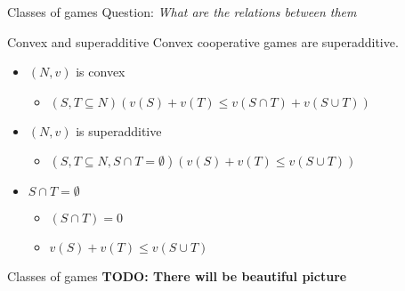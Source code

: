 \documentclass{beamer}
\begin{document}


\begin{frame}{Classes of games}
    Question: \textit{What are the relations between them}
	\begin{block}{Convex and superadditive}
		Convex cooperative games are superadditive.
	\end{block}
	\begin{itemize}
		\item $(N,v)$ is convex
		\begin{itemize}
			\item $\left(S,T \subseteq N\right)\left(v(S)+v(T) \leq v\left(S \cap T\right)+v\left(S \cup T\right)\right)$
		\end{itemize}
		\item $(N,v)$ is superadditive
		\begin{itemize}
			\item $\left(S,T \subseteq N, S \cap T = \emptyset\right)\left(v(S)+v(T) \leq v\left(S \cup T\right)\right)$
		\end{itemize}
		\item $S \cap T = \emptyset$
		\begin{itemize}
			\item $\left(S \cap T\right) = 0$
			\item $v(S)+v(T) \leq v\left(S \cup T\right)$
		\end{itemize}
	\end{itemize}
\end{frame}



\begin{frame}{Classes of games}
    \textbf{TODO: There will be beautiful picture}
\end{frame}


\end{document}
